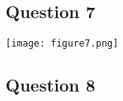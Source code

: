 \documentclass{article}
\begin{document}

\subsection*{Question 7}
\begin{center}\texttt{[image: figure7.png]}\end{center}



\subsection*{Question 8}


\end{document}
